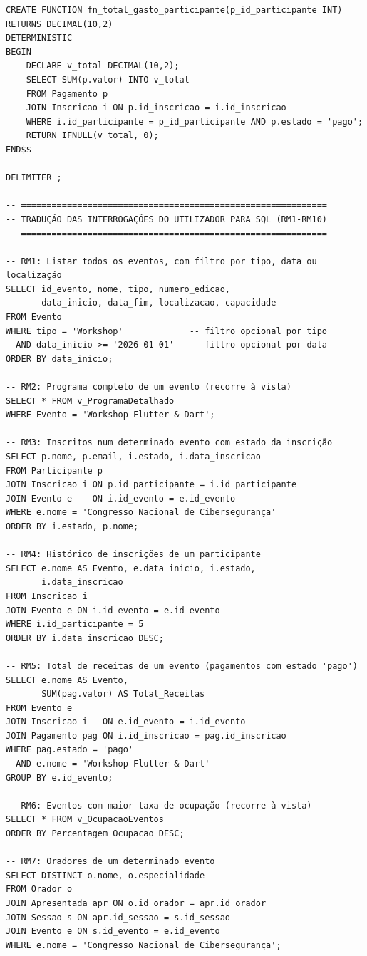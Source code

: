 \documentclass[runningheads]{llncs}
\begin{document}
\begin{small}
\begin{verbatim}
CREATE FUNCTION fn_total_gasto_participante(p_id_participante INT) 
RETURNS DECIMAL(10,2)
DETERMINISTIC
BEGIN
    DECLARE v_total DECIMAL(10,2);
    SELECT SUM(p.valor) INTO v_total
    FROM Pagamento p
    JOIN Inscricao i ON p.id_inscricao = i.id_inscricao
    WHERE i.id_participante = p_id_participante AND p.estado = 'pago';
    RETURN IFNULL(v_total, 0);
END$$

DELIMITER ;

-- ============================================================
-- TRADUÇÃO DAS INTERROGAÇÕES DO UTILIZADOR PARA SQL (RM1-RM10)
-- ============================================================

-- RM1: Listar todos os eventos, com filtro por tipo, data ou localização
SELECT id_evento, nome, tipo, numero_edicao,
       data_inicio, data_fim, localizacao, capacidade
FROM Evento
WHERE tipo = 'Workshop'             -- filtro opcional por tipo
  AND data_inicio >= '2026-01-01'   -- filtro opcional por data
ORDER BY data_inicio;

-- RM2: Programa completo de um evento (recorre à vista)
SELECT * FROM v_ProgramaDetalhado
WHERE Evento = 'Workshop Flutter & Dart';

-- RM3: Inscritos num determinado evento com estado da inscrição
SELECT p.nome, p.email, i.estado, i.data_inscricao
FROM Participante p
JOIN Inscricao i ON p.id_participante = i.id_participante
JOIN Evento e    ON i.id_evento = e.id_evento
WHERE e.nome = 'Congresso Nacional de Cibersegurança'
ORDER BY i.estado, p.nome;

-- RM4: Histórico de inscrições de um participante
SELECT e.nome AS Evento, e.data_inicio, i.estado,
       i.data_inscricao
FROM Inscricao i
JOIN Evento e ON i.id_evento = e.id_evento
WHERE i.id_participante = 5
ORDER BY i.data_inscricao DESC;

-- RM5: Total de receitas de um evento (pagamentos com estado 'pago')
SELECT e.nome AS Evento,
       SUM(pag.valor) AS Total_Receitas
FROM Evento e
JOIN Inscricao i   ON e.id_evento = i.id_evento
JOIN Pagamento pag ON i.id_inscricao = pag.id_inscricao
WHERE pag.estado = 'pago'
  AND e.nome = 'Workshop Flutter & Dart'
GROUP BY e.id_evento;

-- RM6: Eventos com maior taxa de ocupação (recorre à vista)
SELECT * FROM v_OcupacaoEventos
ORDER BY Percentagem_Ocupacao DESC;

-- RM7: Oradores de um determinado evento
SELECT DISTINCT o.nome, o.especialidade
FROM Orador o
JOIN Apresentada apr ON o.id_orador = apr.id_orador
JOIN Sessao s ON apr.id_sessao = s.id_sessao
JOIN Evento e ON s.id_evento = e.id_evento
WHERE e.nome = 'Congresso Nacional de Cibersegurança';


\end{verbatim}
\end{small}
\end{document}
